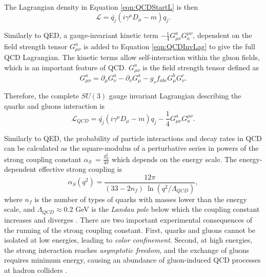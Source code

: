The Lagrangian density in Equation \ref{eqn:QCDStartL} is then 
\begin{equation}
\mathcal{L} = \bar{q_{j}}(i\gamma^{\mu}D_{\mu} - m )q_{j}.
\label{eqn:QCDInvLag}
\end{equation}

Similarly to QED, a gauge-invariant kinetic term $-\frac{1}{4}G^{a}_{\mu\nu}G^{\mu\nu}_{a}$, dependent on the field strength tensor $G^{a}_{\mu\nu}$ is added to Equation \ref{eqn:QCDInvLag} to give the full QCD Lagrangian. The kinetic terms allow self-interaction within the gluon fields, which is an important feature of QCD. $G^{a}_{\mu\nu}$ is the field strength tensor defined as
\begin{equation}
G^{a}_{\mu\nu} = \partial_{\mu}G^{a}_{\nu} - \partial_{\nu}G^{a}_{\mu} - g_{s}f_{abc}G^{b}_{\mu}G^{c}_{\nu}.
\label{eqn:QCDFullLag}
\end{equation}

Therefore, the complete $SU(3)$ gauge invariant Lagrangian describing the quarks and gluons interaction is
\begin{equation}
\mathcal{L}_{QCD} = \bar{q_{j}}(i\gamma^{\mu}D_{\mu} - m )q_{j} -\frac{1}{4}G^{a}_{\mu\nu}G^{\mu\nu}_{a}. 
\label{eqn:QCDCompleteLag}
\end{equation}

Similarly to QED, the probability of particle interactions and decay rates in QCD can be calculated as the square-modulus of a perturbative series in
powers of the strong coupling constant $\alpha _{S} ~=\frac{g_{S}^2}{4\pi}$ which depends on the energy scale. The energy-dependent effective strong coupling is 
\begin{equation}
    \alpha_{S}(q^2) = \frac{12\pi}{(33-2n_{f}) ~ \ln(q^2/\Lambda_{QCD})},
\end{equation}
where $n_{f}$ is the number of types of quarks with masses lower than the energy scale, and $\Lambda_{QCD}\approx0.2$ GeV is the \textit{Landau pole} below which the coupling constant increases and diverges \cite{AlphaQCD}. There are two important experimental consequences of the running of the strong coupling constant. First, quarks and gluons cannot be isolated at low energies, leading to \textit{color confinement}. Second, at high energies, the strong interaction reaches \textit{asymptotic freedom}, and the exchange of gluons requires minimum energy, causing an abundance of gluon-induced QCD processes at hadron colliders \cite{AlphaQCD}. 

